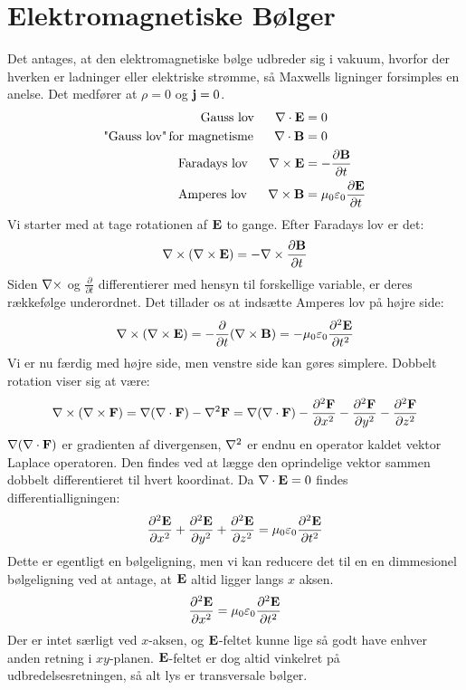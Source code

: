 \section{Elektromagnetiske Bølger}
Det antages, at den elektromagnetiske bølge udbreder sig i vakuum, hvorfor der hverken er ladninger eller elektriske strømme, så Maxwells ligninger forsimples en anelse. Det medfører at $\rho=0$ og $\mathbf{j}=0$. 
\begin{align}
\text{Gauss lov}~~~~~\mathbf{\nabla}\cdot \mathbf{E} &= 0\\
\text{"Gauss lov"\,for magnetisme}~~~~~\mathbf{\nabla}\cdot \mathbf{B} &= 0\\
\text{Faradays lov}~~~~~\mathbf{\nabla}\times \mathbf{E} &= -\frac{\partial \mathbf{B}}{\partial t}\\
\text{Amperes lov}~~~~~\mathbf{\nabla}\times \mathbf{B} &= \mu_0\varepsilon_0 \frac{\partial \mathbf{E}}{\partial t}
\end{align}
Vi starter med at tage rotationen af $\mathbf{E}$ to gange. Efter Faradays lov er  det:
\begin{equation}
\mathbf{\nabla}\times (\mathbf{\nabla}\times\mathbf{E}) = -\mathbf{\nabla}\times\frac{\partial \mathbf{B}}{\partial t}
\end{equation}
Siden $\mathbf{\nabla}\times$ og $\frac{\partial}{\partial t}$ differentierer med hensyn til forskellige variable, er deres rækkefølge underordnet. Det tillader os at indsætte Amperes lov på højre side:
\begin{equation}
\mathbf{\nabla}\times (\mathbf{\nabla}\times\mathbf{E})  = -\frac{\partial}{\partial t}(\mathbf{\nabla}\times \mathbf{B}) = -\mu_0\varepsilon_0\frac{\partial^2 \mathbf{E}}{\partial t^2}
\end{equation}
Vi er nu færdig med højre side, men venstre side kan gøres simplere. Dobbelt rotation viser sig at være: 
\begin{equation}
\mathbf{\nabla}\times (\mathbf{\nabla}\times\mathbf{F}) =\mathbf{\nabla}(\mathbf{\nabla}\cdot \mathbf{F})- \mathbf{\nabla}^2\mathbf{F} = \mathbf{\nabla}(\mathbf{\nabla}\cdot \mathbf{F})-\frac{\partial^2 \mathbf{F}}{\partial x^2}-\frac{\partial^2 \mathbf{F}}{\partial y^2}-\frac{\partial^2 \mathbf{F}}{\partial z^2}
\end{equation}
$\mathbf{\nabla}(\mathbf{\nabla}\cdot \mathbf{F})$ er gradienten af divergensen, $\mathbf{\nabla}^2$ er endnu en operator kaldet vektor Laplace operatoren. Den findes ved at lægge den oprindelige vektor sammen dobbelt differentieret til hvert koordinat. 
Da $\mathbf{\nabla}\cdot\mathbf{E}=0$ findes differentialligningen:
\begin{equation}
\frac{\partial^2\mathbf{E}}{\partial x^2}+\frac{\partial^2\mathbf{E}}{\partial y^2}+\frac{\partial^2\mathbf{E}}{\partial z^2} = \mu_0\varepsilon_0\frac{\partial^2 \mathbf{E}}{\partial t^2}
\end{equation}
Dette er egentligt en bølgeligning, men vi kan reducere det til en en dimmesionel bølgeligning ved at antage, at $\mathbf{E}$ altid ligger langs $x$ aksen.
\begin{equation}
\frac{\partial^2 \mathbf{E}}{\partial x^2} = \mu_0\varepsilon_0\frac{\partial^2\mathbf{E}}{\partial t^2}
\label{eq:Ebolgeligning}
\end{equation}
Der er intet særligt ved $x$-aksen, og $\mathbf{E}$-feltet kunne lige så godt have enhver anden retning i $xy$-planen. $\mathbf{E}$-feltet er dog altid vinkelret på udbredelsesretningen, så alt lys er transversale bølger. 

